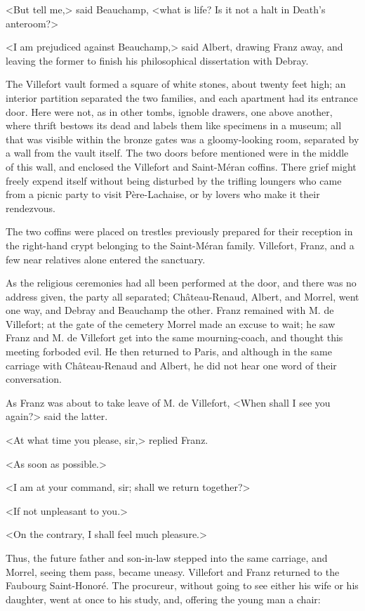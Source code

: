  <But tell me,> said Beauchamp, <what is life? Is it not a halt in Death's anteroom?>

<I am prejudiced against Beauchamp,> said Albert, drawing Franz away, and leaving the former to finish his philosophical dissertation with Debray. 

 The Villefort vault formed a square of white stones, about twenty feet high; an interior partition separated the two families, and each apartment had its entrance door. Here were not, as in other tombs, ignoble drawers, one above another, where thrift bestows its dead and labels them like specimens in a museum; all that was visible within the bronze gates was a gloomy-looking room, separated by a wall from the vault itself. The two doors before mentioned were in the middle of this wall, and enclosed the Villefort and Saint-Méran coffins. There grief might freely expend itself without being disturbed by the trifling loungers who came from a picnic party to visit Père-Lachaise, or by lovers who make it their rendezvous. 

 The two coffins were placed on trestles previously prepared for their reception in the right-hand crypt belonging to the Saint-Méran family. Villefort, Franz, and a few near relatives alone entered the sanctuary. 

 As the religious ceremonies had all been performed at the door, and there was no address given, the party all separated; Château-Renaud, Albert, and Morrel, went one way, and Debray and Beauchamp the other. Franz remained with M. de Villefort; at the gate of the cemetery Morrel made an excuse to wait; he saw Franz and M. de Villefort get into the same mourning-coach, and thought this meeting forboded evil. He then returned to Paris, and although in the same carriage with Château-Renaud and Albert, he did not hear one word of their conversation. 

 As Franz was about to take leave of M. de Villefort, <When shall I see you again?> said the latter. 

 <At what time you please, sir,> replied Franz. 

 <As soon as possible.> 

 <I am at your command, sir; shall we return together?> 

 <If not unpleasant to you.> 

 <On the contrary, I shall feel much pleasure.> 

 Thus, the future father and son-in-law stepped into the same carriage, and Morrel, seeing them pass, became uneasy. Villefort and Franz returned to the Faubourg Saint-Honoré. The procureur, without going to see either his wife or his daughter, went at once to his study, and, offering the young man a chair: 

